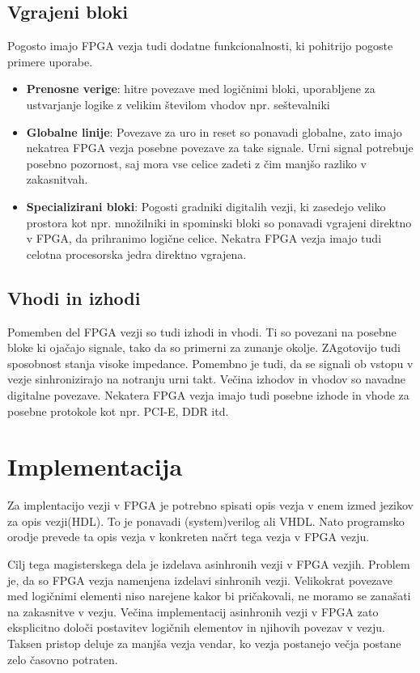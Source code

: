 \subsection{Vgrajeni bloki}
Pogosto imajo FPGA vezja tudi dodatne funkcionalnosti, ki pohitrijo pogoste primere uporabe.

\begin{itemize}
	\item \textbf{Prenosne verige}: hitre povezave med logičnimi bloki, uporabljene za ustvarjanje logike z velikim številom vhodov npr. seštevalniki
	\item \textbf{Globalne linije}: Povezave za uro in reset so ponavadi globalne, zato imajo nekatrea FPGA vezja posebne povezave za take signale. Urni signal potrebuje posebno pozornost, saj mora vse celice zadeti z čim manjšo razliko v zakasnitvah.
	\item \textbf{Specializirani bloki}: Pogosti gradniki digitalih vezji, ki zasedejo veliko prostora kot npr. množilniki in spominski bloki so ponavadi vgrajeni direktno v FPGA, da prihranimo logične celice. Nekatra FPGA vezja imajo tudi celotna procesorska jedra direktno vgrajena.
\end{itemize}



\subsection{Vhodi in izhodi}

Pomemben del FPGA vezji so tudi izhodi in vhodi. Ti so povezani na posebne bloke ki ojačajo signale, tako da so primerni za zunanje okolje. ZAgotovijo tudi sposobnost stanja visoke impedance. Pomembno je tudi, da se signali ob vstopu v vezje sinhronizirajo na notranju urni takt. Večina izhodov in vhodov so navadne digitalne povezave. Nekatera FPGA vezja imajo tudi posebne izhode in vhode za posebne protokole kot npr. PCI-E, DDR itd.



\section{Implementacija} \label{a}
Za implentacijo vezji v FPGA je potrebno spisati opis vezja v enem izmed jezikov za opis vezji(HDL). To je ponavadi (system)verilog ali VHDL. Nato programsko orodje prevede ta opis vezja v konkreten načrt tega vezja v FPGA vezju.

Cilj tega magisterskega dela je izdelava asinhronih vezji v FPGA vezjih. Problem je, da so FPGA vezja namenjena izdelavi sinhronih vezji. Velikokrat povezave med logičnimi elementi niso narejene kakor bi pričakovali, ne moramo se zanašati na zakasnitve v vezju. Večina implementacij asinhronih vezji v FPGA zato eksplicitno določi postavitev logičnih elementov in njihovih povezav v vezju. Taksen pristop deluje za manjša vezja vendar, ko vezja postanejo večja postane zelo časovno potraten. 

